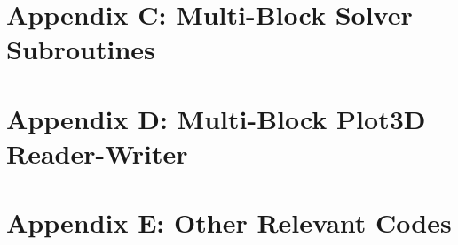 \documentclass[twocolumn,10pt]{asme2ej}
\begin{document}
\section*{Appendix C: Multi-Block Solver Subroutines}


\clearpage

\section*{Appendix D: Multi-Block Plot3D Reader-Writer}


\section*{Appendix E: Other Relevant Codes}






%

%

%

\end{document}
